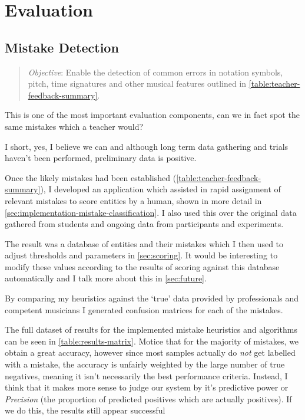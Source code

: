 \chapter{Evaluation}

\section{Mistake Detection}

\begin{quotation}
\emph{Objective}: Enable the detection of common errors in notation symbols, pitch, time signatures and other musical features outlined in \cref{table:teacher-feedback-summary}.
\end{quotation}

This is one of the most important evaluation components, can we in fact spot the same mistakes which a teacher would?

I short, yes, I believe we can and although long term data gathering and trials haven't been performed, preliminary data is positive.

Once the likely mistakes had been established (\cref{table:teacher-feedback-summary}), I developed an application which assisted in rapid assignment of relevant mistakes to score entities by a human, shown in more detail in \cref{sec:implementation-mistake-classification}. I also used this over the original data gathered from students and ongoing data from participants and experiments.

The result was a database of entities and their mistakes which I then used to adjust thresholds and parameters in \cref{sec:scoring}. It would be interesting to modify these values according to the results of scoring against this database automatically and I talk more about this in \cref{sec:future}.

By comparing my heuristics against the `true' data provided by professionals and competent musicians I generated confusion matrices for each of the mistakes.

The full dataset of results for the implemented mistake heuristics and algorithms can be seen in \cref{table:results-matrix}. Motice that for the majority of mistakes, we obtain a great accuracy, however since most samples actually do \emph{not} get labelled with a mistake, the accuracy is unfairly weighted by the large number of true negatives, meaning it isn't necessarily the best performance criteria. Instead, I think that it makes more sense to judge our system by it's predictive power or \emph{Precision} (the proportion of predicted positives which are actually positives). If we do this, the results still appear successful


